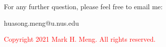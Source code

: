 \begin{frame}{}
	\centering  
	For any further question, please feel free to email me:\vspace{10pt}
	
	huasong.meng@u.nus.edu\\\vspace{3pt}
	
	\begin{tcolorbox}
		\begin{center}
			\textcolor{red}{Copyright 2021 Mark H. Meng. All rights reserved.}
		\end{center}
	\end{tcolorbox}
\end{frame}
